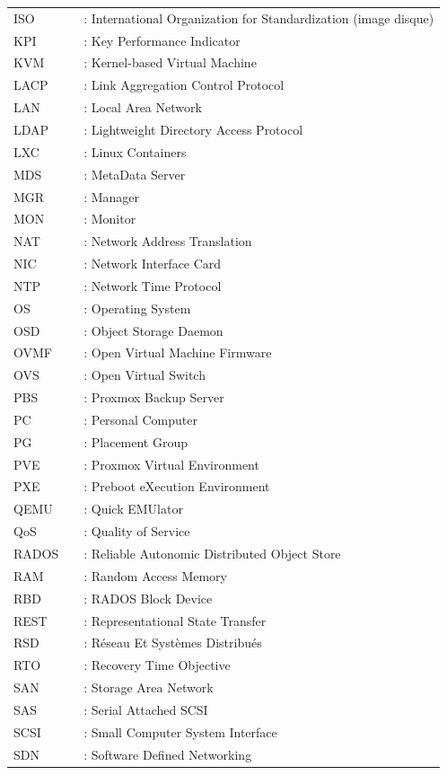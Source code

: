\begin{longtable}{lcl}
ISO  && : International Organization for Standardization (image disque)\\
KPI  && : Key Performance Indicator\\
KVM  && : Kernel-based Virtual Machine\\
LACP && : Link Aggregation Control Protocol\\
LAN  && : Local Area Network\\
LDAP && : Lightweight Directory Access Protocol\\
LXC  && : Linux Containers\\
MDS  && : MetaData Server\\
MGR  && : Manager\\
MON  && : Monitor\\
NAT  && : Network Address Translation\\
NIC  && : Network Interface Card\\
NTP  && : Network Time Protocol\\
OS   && : Operating System\\
OSD  && : Object Storage Daemon\\
OVMF && : Open Virtual Machine Firmware\\
OVS  && : Open Virtual Switch\\
PBS  && : Proxmox Backup Server\\
PC   && : Personal Computer\\
PG   && : Placement Group\\
PVE  && : Proxmox Virtual Environment\\
PXE  && : Preboot eXecution Environment\\
QEMU && : Quick EMUlator\\
QoS  && : Quality of Service\\
RADOS && : Reliable Autonomic Distributed Object Store\\
RAM  && : Random Access Memory\\
RBD  && : RADOS Block Device\\
REST && : Representational State Transfer\\
RSD  && : Réseau Et Systèmes Distribués\\
RTO  && : Recovery Time Objective\\
SAN  && : Storage Area Network\\
SAS  && : Serial Attached SCSI\\
SCSI && : Small Computer System Interface\\
SDN  && : Software Defined Networking\\

\end{longtable}

